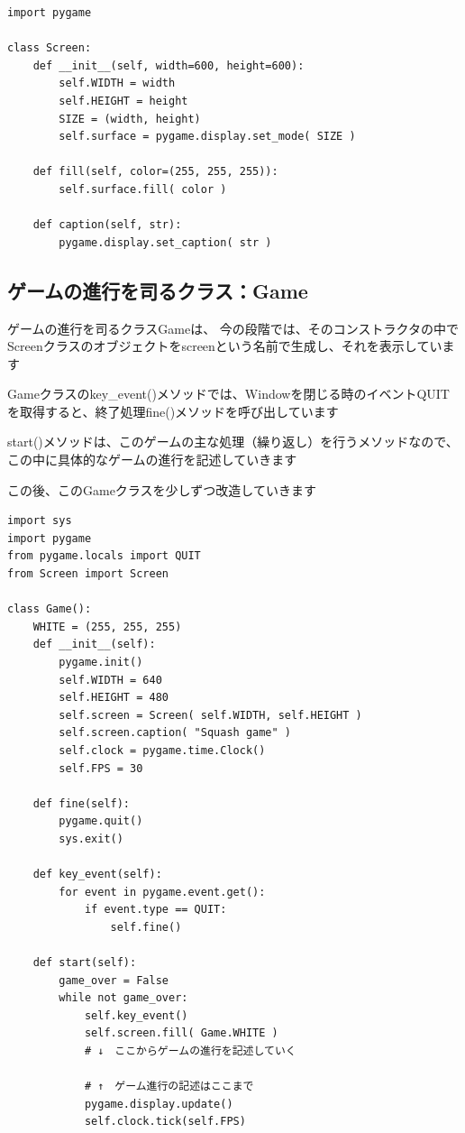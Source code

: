 \documentclass[uplatex,a4paper,11pt,oneside,openany]{jsbook}
\begin{document}
\begin{lstlisting}[caption=Class Screen,label=p2]
import pygame

class Screen:
    def __init__(self, width=600, height=600):
        self.WIDTH = width
        self.HEIGHT = height
        SIZE = (width, height)
        self.surface = pygame.display.set_mode( SIZE )

    def fill(self, color=(255, 255, 255)):
        self.surface.fill( color )

    def caption(self, str):
        pygame.display.set_caption( str )
\end{lstlisting}

\subsection{ゲームの進行を司るクラス：Game}

ゲームの進行を司るクラスGameは、
今の段階では、そのコンストラクタの中でScreenクラスのオブジェクトをscreenという名前で生成し、それを表示しています

Gameクラスのkey\_event()メソッドでは、Windowを閉じる時のイベントQUITを取得すると、終了処理fine()メソッドを呼び出しています

start()メソッドは、このゲームの主な処理（繰り返し）を行うメソッドなので、この中に具体的なゲームの進行を記述していきます

この後、このGameクラスを少しずつ改造していきます

\begin{lstlisting}[caption=Gameクラス（screenオブジェクトを生成）,label=p1]
import sys
import pygame
from pygame.locals import QUIT
from Screen import Screen

class Game():
    WHITE = (255, 255, 255)
    def __init__(self):
        pygame.init()
        self.WIDTH = 640
        self.HEIGHT = 480
        self.screen = Screen( self.WIDTH, self.HEIGHT )
        self.screen.caption( "Squash game" )
        self.clock = pygame.time.Clock()
        self.FPS = 30

    def fine(self):
        pygame.quit()
        sys.exit()

    def key_event(self):
        for event in pygame.event.get():
            if event.type == QUIT:
                self.fine()

    def start(self):
        game_over = False
        while not game_over:
            self.key_event()
            self.screen.fill( Game.WHITE )
            # ↓　ここからゲームの進行を記述していく

            # ↑　ゲーム進行の記述はここまで
            pygame.display.update()
            self.clock.tick(self.FPS)
\end{lstlisting}
\end{document}
